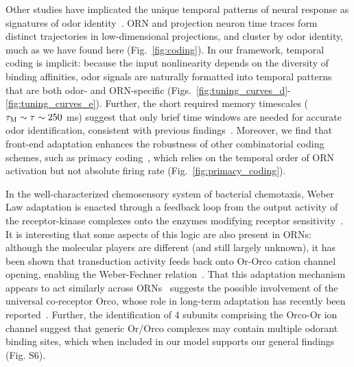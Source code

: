 \documentclass[10pt,prl,aps,showpacs,twocolumn,unsortedaddress]{revtex4-1}
\begin{document}
Other studies have implicated the unique temporal patterns of neural response as signatures of odor identity~\cite{stopfer_temporal_model, multiple_timescales_stopfer, stopfer_nat_neuro, stopfer_temporal_channel}. ORN and projection neuron time traces form distinct trajectories in low-dimensional projections, and cluster by odor identity, much as we have found here (Fig.~\ref{fig:coding}). In our framework, temporal coding is implicit: because the input nonlinearity depends on the diversity of binding affinities, %
odor signals are naturally formatted into temporal patterns that are both odor- and ORN-specific  (Figs.~\ref{fig:tuning_curves_d}-\ref{fig:tuning_curves_e}). Further, the short required memory timescales  ($\tau_{\textup M} \sim \tau \sim 250$ ms) suggest that only brief time windows are needed for accurate odor identification, consistent with previous findings~\cite{stopfer_nat_neuro}. Moreover, we find that front-end adaptation enhances the robustness of other combinatorial coding schemes, such as primacy coding~\cite{primacy_coding}, which relies on the temporal order of ORN activation but not absolute firing rate (Fig.~\ref{fig:primacy_coding}).

In the well-characterized chemosensory system of bacterial chemotaxis, Weber Law adaptation is enacted through a feedback loop from the output activity of the receptor-kinase complexes onto the enzymes modifying receptor sensitivity~\cite{EmonetReview}. It is interesting that some aspects of this logic are also present in ORNs: although the molecular players are different (and still largely unknown), it has been shown that transduction activity feeds back onto Or-Orco cation channel opening, enabling the Weber-Fechner relation~\cite{nagel_wilson_biophysical,srinivas_elife,cao_WL}. 
That this adaptation mechanism appears to act similarly across ORNs~\cite{srinivas_elife,martelli,cao_WL} suggests the possible involvement of the universal co-receptor Orco, whose role in long-term adaptation has recently been reported~\cite{getahun2013insect,getahun2016intracellular,Guo_Smith}. Further, the identification of 4 subunits comprising the Orco-Or ion channel suggest that generic Or/Orco complexes may contain multiple odorant binding sites, which when included in our model supports our general findings (Fig. S6).
\end{document}

